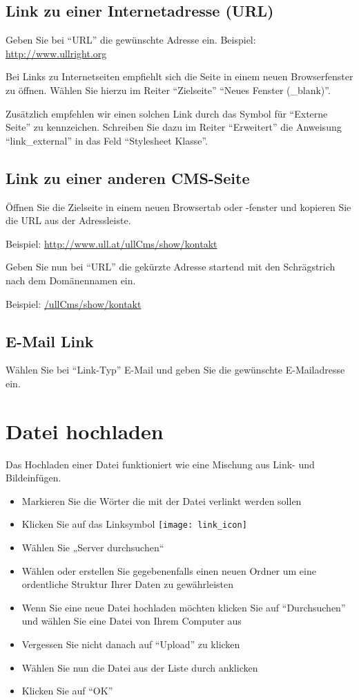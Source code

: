 \documentclass[article, a4paper, oneside, 11pt]{memoir}
\begin{document}
\subsection{Link zu einer Internetadresse (URL)}
Geben Sie bei "`URL"' die gewünschte Adresse ein. Beispiel: \url{http://www.ullright.org}

Bei Links zu Internetseiten empfiehlt sich die Seite in einem neuen Browserfenster zu öffnen. Wählen Sie hierzu im Reiter "`Zielseite"' "`Neues Fenster (\_blank)"'.

Zusätzlich empfehlen wir einen solchen Link durch das Symbol für "`Externe Seite"' zu kennzeichen. Schreiben Sie dazu im Reiter "`Erweitert"' die Anweisung "`link\_external"' in das Feld "`Stylesheet Klasse"'.

\subsection{Link zu einer anderen CMS-Seite}

Öffnen Sie die Zielseite in einem neuen Browsertab oder -fenster und kopieren Sie die URL aus der Adressleiste.

Beispiel: \url{http://www.ull.at/ullCms/show/kontakt}

Geben Sie nun bei "`URL"' die gekürzte Adresse startend mit den Schrägstrich nach dem Domänennamen ein.

Beispiel: \url{/ullCms/show/kontakt}

\subsection{E-Mail Link}

Wählen Sie bei "`Link-Typ"' E-Mail und geben Sie die gewünschte E-Mailadresse ein.



\section{Datei hochladen}
\label{sec:upload_file}

Das Hochladen einer Datei funktioniert wie eine Mischung aus Link- und Bildeinfügen.

\begin{itemize}
\item Markieren Sie die Wörter die mit der Datei verlinkt werden sollen
\item Klicken Sie auf das Linksymbol \texttt{[image: link\_icon]}
\item Wählen Sie „Server durchsuchen“
\item Wählen oder erstellen Sie gegebenenfalls einen neuen Ordner um eine ordentliche Struktur Ihrer Daten zu gewährleisten
\item Wenn Sie eine neue Datei hochladen möchten klicken Sie auf "`Durchsuchen"' und wählen Sie eine Datei von Ihrem Computer aus
\item Vergessen Sie nicht danach auf "`Upload"' zu klicken
\item Wählen Sie nun die Datei aus der Liste durch anklicken
\item Klicken Sie auf "`OK"'
\end{itemize}
\end{document}
